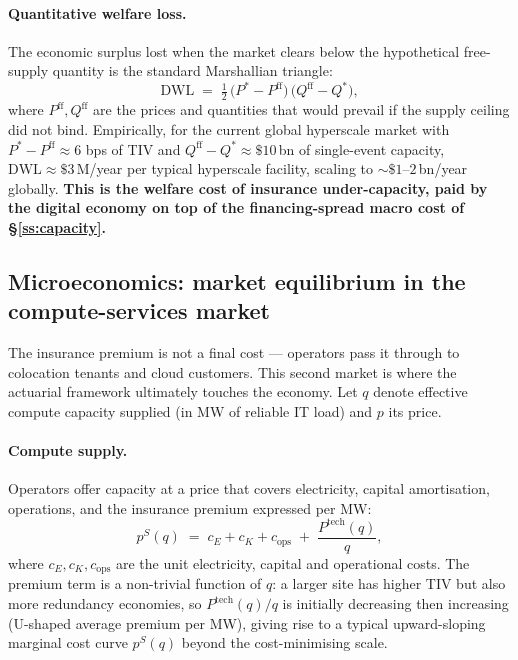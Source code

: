 \paragraph{Quantitative welfare loss.}
The economic surplus lost when the market clears below the
hypothetical free-supply quantity is the standard Marshallian
triangle:
\begin{equation}\label{eq:dwl}
   \mathrm{DWL} \;=\; \tfrac{1}{2}\,
   \bigl(P^* - P^{\mathrm{ff}}\bigr)\,
   \bigl(Q^{\mathrm{ff}} - Q^*\bigr),
\end{equation}
where $P^{\mathrm{ff}},Q^{\mathrm{ff}}$ are the prices and quantities
that would prevail if the supply ceiling did not bind. Empirically,
for the current global hyperscale market with $P^*-P^{\mathrm{ff}}
\approx 6$ bps of TIV and $Q^{\mathrm{ff}}-Q^*\approx \$10\,$bn of
single-event capacity, $\mathrm{DWL}\approx\$3\,$M/year per typical
hyperscale facility, scaling to $\sim\$1$--$2\,$bn/year globally.
\textbf{This is the welfare cost of insurance under-capacity, paid
by the digital economy on top of the financing-spread macro cost of
\S\ref{ss:capacity}.}

\subsection{Microeconomics: market equilibrium in the compute-services market}\label{ss:compute-mkt}

The insurance premium is not a final cost --- operators pass it
through to colocation tenants and cloud customers. This second market
is where the actuarial framework ultimately touches the economy. Let
$q$ denote effective compute capacity supplied (in \si{\mega\watt} of
reliable IT load) and $p$ its price.

\paragraph{Compute supply.} Operators offer capacity at a price that
covers electricity, capital amortisation, operations, and the
insurance premium expressed per MW:
\begin{equation}\label{eq:compute-supply}
   p^S(q) \;=\; c_E + c_K + c_{\mathrm{ops}}
            \;+\; \frac{P^{\mathrm{tech}}(q)}{q},
\end{equation}
where $c_E,c_K,c_{\mathrm{ops}}$ are the unit electricity, capital
and operational costs. The premium term is a non-trivial function of
$q$: a larger site has higher TIV but also more redundancy economies,
so $P^{\mathrm{tech}}(q)/q$ is initially decreasing then increasing
(U-shaped average premium per MW), giving rise to a typical
upward-sloping marginal cost curve $p^S(q)$ beyond the cost-minimising
scale.

